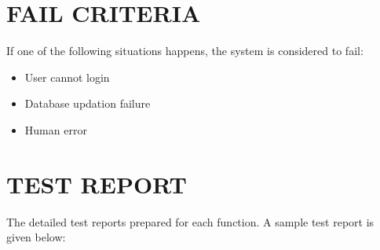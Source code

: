 \documentclass[12pt,a4paper,oneside]{report}
\begin{document}
\section{FAIL CRITERIA}
\par If one of the following situations happens, the system is considered to fail:
\begin{itemize}
\item  User cannot login
\item  Database updation failure
\item  Human error
\end{itemize}


\newpage
\section{TEST REPORT}
\par The detailed test reports prepared for each function. A sample test report is given below:
\\
\end{document}
